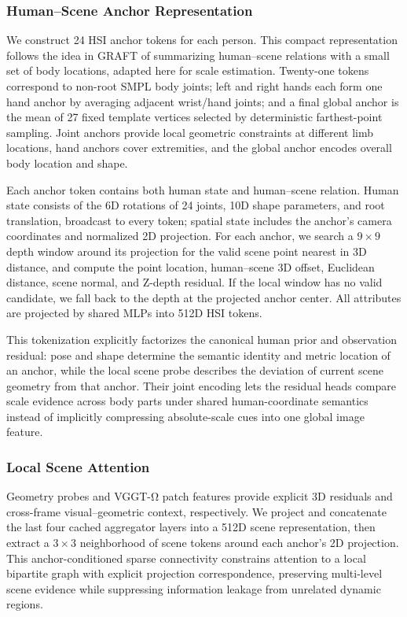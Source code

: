 \documentclass{article}
\begin{document}
\subsubsection{Human--Scene Anchor Representation}

We construct 24 HSI anchor tokens for each person. This compact representation follows the idea in GRAFT of summarizing human--scene relations with a small set of body locations, adapted here for scale estimation. Twenty-one tokens correspond to non-root SMPL body joints; left and right hands each form one hand anchor by averaging adjacent wrist/hand joints; and a final global anchor is the mean of 27 fixed template vertices selected by deterministic farthest-point sampling. Joint anchors provide local geometric constraints at different limb locations, hand anchors cover extremities, and the global anchor encodes overall body location and shape.

Each anchor token contains both human state and human--scene relation. Human state consists of the 6D rotations of 24 joints, 10D shape parameters, and root translation, broadcast to every token; spatial state includes the anchor's camera coordinates and normalized 2D projection. For each anchor, we search a $9\times 9$ depth window around its projection for the valid scene point nearest in 3D distance, and compute the point location, human--scene 3D offset, Euclidean distance, scene normal, and Z-depth residual. If the local window has no valid candidate, we fall back to the depth at the projected anchor center. All attributes are projected by shared MLPs into 512D HSI tokens.

This tokenization explicitly factorizes the canonical human prior and observation residual: pose and shape determine the semantic identity and metric location of an anchor, while the local scene probe describes the deviation of current scene geometry from that anchor. Their joint encoding lets the residual heads compare scale evidence across body parts under shared human-coordinate semantics instead of implicitly compressing absolute-scale cues into one global image feature.

\subsubsection{Local Scene Attention}

Geometry probes and VGGT-Ω patch features provide explicit 3D residuals and cross-frame visual--geometric context, respectively. We project and concatenate the last four cached aggregator layers into a 512D scene representation, then extract a $3\times 3$ neighborhood of scene tokens around each anchor's 2D projection. This anchor-conditioned sparse connectivity constrains attention to a local bipartite graph with explicit projection correspondence, preserving multi-level scene evidence while suppressing information leakage from unrelated dynamic regions.
\end{document}
